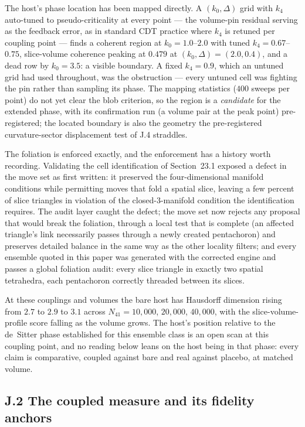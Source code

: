 \documentclass[11pt]{article}
\begin{document}
The host's phase location has been mapped directly. A $(k_0,\Delta)$ grid with $k_4$ auto-tuned to pseudo-criticality at every point --- the volume-pin residual serving as the feedback error, as in standard CDT practice where $k_4$ is retuned per coupling point --- finds a coherent region at $k_0=1.0$--$2.0$ with tuned $k_4=0.67$--$0.75$, slice-volume coherence peaking at $0.479$ at $(k_0,\Delta)=(2.0,0.4)$, and a dead row by $k_0=3.5$: a visible boundary. A fixed $k_4=0.9$, which an untuned grid had used throughout, was the obstruction --- every untuned cell was fighting the pin rather than sampling its phase. The mapping statistics ($400$ sweeps per point) do not yet clear the blob criterion, so the region is a \emph{candidate} for the extended phase, with its confirmation run (a volume pair at the peak point) pre-registered; the located boundary is also the geometry the pre-registered curvature-sector displacement test of J.4 straddles.

The foliation is enforced exactly, and the enforcement has a history worth recording. Validating the cell identification of Section~23.1 exposed a defect in the move set as first written: it preserved the four-dimensional manifold conditions while permitting moves that fold a spatial slice, leaving a few percent of slice triangles in violation of the closed-$3$-manifold condition the identification requires. The audit layer caught the defect; the move set now rejects any proposal that would break the foliation, through a local test that is complete (an affected triangle's link necessarily passes through a newly created pentachoron) and preserves detailed balance in the same way as the other locality filters; and every ensemble quoted in this paper was generated with the corrected engine and passes a global foliation audit: every slice triangle in exactly two spatial tetrahedra, each pentachoron correctly threaded between its slices.

At these couplings and volumes the bare host has Hausdorff dimension rising from $2.7$ to $2.9$ to $3.1$ across $N_{41}=10{,}000$, $20{,}000$, $40{,}000$, with the slice-volume-profile score falling as the volume grows. The host's position relative to the de~Sitter phase established for this ensemble class \citep{AmbjornJurkiewiczLoll2004} is an open scan at this coupling point, and no reading below leans on the host being in that phase: every claim is comparative, coupled against bare and real against placebo, at matched volume.

\subsection*{J.2 The coupled measure and its fidelity anchors}
\end{document}
